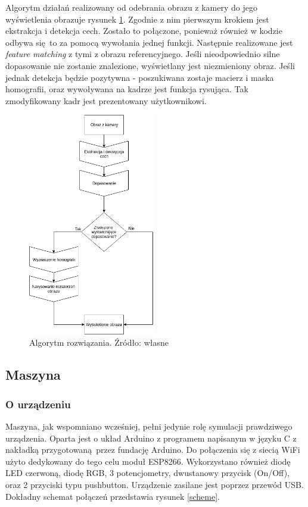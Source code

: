 \documentclass[12pt,twoside,polish]{article}
\begin{document}
Algorytm działań realizowany od odebrania obrazu z kamery do jego wyświetlenia obrazuje rysunek \ref{alg}. Zgodnie z nim pierwszym krokiem jest ekstrakcja i detekcja cech. Zostało to połączone, ponieważ również w kodzie odbywa się to za pomocą wywołania jednej funkcji. Następnie realizowane jest \emph{feature matching} z tymi z obrazu referencyjnego. Jeśli nieodpowiednio silne dopasowanie nie zostanie znalezione, wyświetlany jest niezmieniony obraz. Jeśli jednak detekcja będzie pozytywna - poszukiwana zostaje macierz i maska homografii, oraz wywoływana na kadrze jest funkcja rysująca. Tak zmodyfikowany kadr jest prezentowany użytkownikowi.

\begin{figure}[h]
	\centering	
	\includegraphics[width=0.5\textwidth]{algorithm}
	\caption{Algorytm rozwiązania. Źródło: własne}
	\label{alg}
\end{figure}

\subsection{Maszyna}
\subsubsection*{O urządzeniu}
Maszyna, jak wspomniano wcześniej, pełni jedynie rolę symulacji prawdziwego urządzenia. Oparta jest o układ Arduino z programem napisanym w języku C z nakładką przygotowaną przez fundację Arduino. Do połączenia się z siecią WiFi użyto dedykowany do tego celu moduł ESP8266. Wykorzystano również diodę LED czerwoną, diodę RGB, 3 potencjometry, dwustanowy przycisk (On/Off), oraz 2 przyciski typu pushbutton. Urządzenie zasilane jest poprzez przewód USB. Dokładny schemat połączeń przedstawia rysunek \ref{scheme}.
\end{document}
